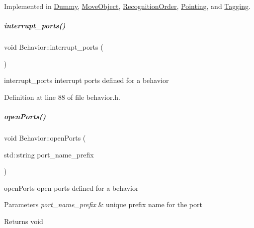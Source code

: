 Implemented in \hyperlink{group__behaviorManager_a493f3a2d8faa22b3175946e13b8dfe88}{Dummy}, \hyperlink{group__behaviorManager_a5e068840a2d5f5fbeafc61b075f63804}{Move\+Object}, \hyperlink{group__behaviorManager_a617221425cec2b16576e02797b788b9f}{Recognition\+Order}, \hyperlink{group__behaviorManager_a1681f79ff201a977a2d9124026d6cac8}{Pointing}, and \hyperlink{group__behaviorManager_a6a67413f90a70012ffc2e67074728c0a}{Tagging}.

\mbox{\label{group__behaviorManager_af22cc728f8096912bb394db4b105bf05}} 
\subparagraph{\texorpdfstring{interrupt\+\_\+ports()}{interrupt\_ports()}}
{\footnotesize\ttfamily void Behavior\+::interrupt\+\_\+ports (\begin{DoxyParamCaption}{ }\end{DoxyParamCaption})\hspace{0.3cm}{\ttfamily [inline]}}



interrupt\+\_\+ports interrupt ports defined for a behavior 



Definition at line 88 of file behavior.\+h.

\mbox{\label{group__behaviorManager_ae3f73b56e5c85cea1e6666c90ef6199c}} 
\subparagraph{\texorpdfstring{open\+Ports()}{openPorts()}}
{\footnotesize\ttfamily void Behavior\+::open\+Ports (\begin{DoxyParamCaption}\item[{std\+::string}]{port\+\_\+name\+\_\+prefix }\end{DoxyParamCaption})\hspace{0.3cm}{\ttfamily [inline]}}



open\+Ports open ports defined for a behavior 


\begin{DoxyParams}{Parameters}
{\em port\+\_\+name\+\_\+prefix} & unique prefix name for the port \\
\hline
\end{DoxyParams}
\begin{DoxyReturn}{Returns}
void 
\end{DoxyReturn}


